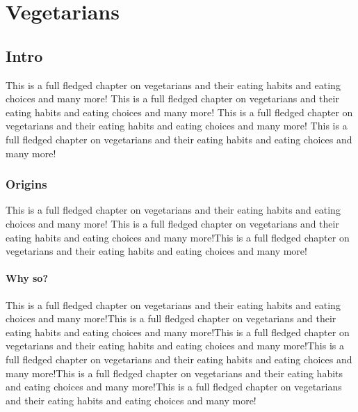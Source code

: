 \documentclass[10pt,a4paper]{report}
\begin{document}
\chapter{Vegetarians}

\section{Intro}
This is a full fledged chapter on vegetarians and their eating habits and eating choices and many more! This is a full fledged chapter on vegetarians and their eating habits and eating choices and many more! This is a full fledged chapter on vegetarians and their eating habits and eating choices and many more! This is a full fledged chapter on vegetarians and their eating habits and eating choices and many more!

\subsection{Origins} This is a full fledged chapter on vegetarians and their eating habits and eating choices and many more! This is a full fledged chapter on vegetarians and their eating habits and eating choices and many more!This is a full fledged chapter on vegetarians and their eating habits and eating choices and many more!

\subsubsection{Why so?}

This is a full fledged chapter on vegetarians and their eating habits and eating choices and many more!This is a full fledged chapter on vegetarians and their eating habits and eating choices and many more!This is a full fledged chapter on vegetarians and their eating habits and eating choices and many more!This is a full fledged chapter on vegetarians and their eating habits and eating choices and many more!This is a full fledged chapter on vegetarians and their eating habits and eating choices and many more!This is a full fledged chapter on vegetarians and their eating habits and eating choices and many more!
\end{document}
